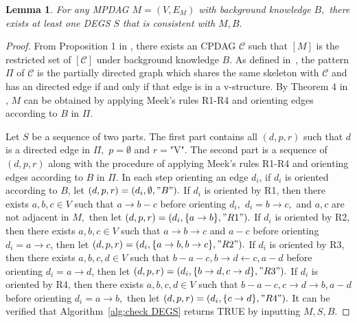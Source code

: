 \documentclass{article}
\newtheorem{lemma}{Lemma}
\begin{document}
\begin{lemma}
\label{lemma:exist DEGS}
For any MPDAG $M=(V,E_M)$ with background knowledge $B,$ there exists at least one DEGS $S$ that is consistent with $M,B.$
\end{lemma}
\begin{proof}
From Proposition 1 in \citep{fang2022representation}, there exists an CPDAG $\mathcal{C}$ such that $[M]$ is the restricted set of $[\mathcal{C}]$ under background knowledge $B.$ As defined in~\citep{meek1995causal}, the pattern $\Pi$ of $\mathcal{C}$ is the partially directed graph which shares the same skeleton with $\mathcal{C}$ and has an directed edge if and only if that edge is in a v-structure. By Theorem 4 in \citep{meek1995causal}, $M$ can be obtained by applying Meek's rules R1-R4 and orienting edges according to $B$ in $\Pi.$ 

Let $S$ be a sequence of two parts. The first part contains all $(d,p,r)$ such that $d$ is a directed edge in $\Pi,$ $p=\emptyset$ and $r=$"V". The second part is a sequence of $(d,p,r)$ along with the procedure of applying Meek's rules R1-R4 and orienting edges according to $B$ in $\Pi.$ In each step orienting an edge $d_i$, if $d_i$ is oriented according to $B$, let $(d,p,r)=(d_i,\emptyset,"B").$ If $d_i$ is oriented by R1, then there exists $a,b,c\in V$ such that $a\to b-c$ before orienting $d_i,$ $d_i=b\to c,$ and $a,c$ are not adjacent in $M,$ then let $(d,p,r)=(d_i,\{a\to b\},"R1").$ If $d_i$ is oriented by R2, then there exists $a,b,c\in V$ such that $a\to b\to c$ and $a-c$ before orienting $d_i=a\to c$, then let $(d,p,r)=(d_i,\{a\to b,b\to c\},"R2").$ If $d_i$ is oriented by R3, then there exists $a,b,c,d\in V$ such that $b-a-c,b\to d\leftarrow c,a-d$ before orienting $d_i=a\to d$, then let $(d,p,r)=(d_i,\{b\to d,c\to d\},"R3").$ If $d_i$ is oriented by R4, then there exists $a,b,c,d\in V$ such that $b-a-c,c\to d\to b,a-d$ before orienting $d_i=a\to b,$ then let $(d,p,r)=(d_i,\{c\to d\},"R4").$ It can be verified that Algorithm~\ref{alg:check DEGS} returns TRUE by inputting $M,S,B.$
\end{proof}
\end{document}
